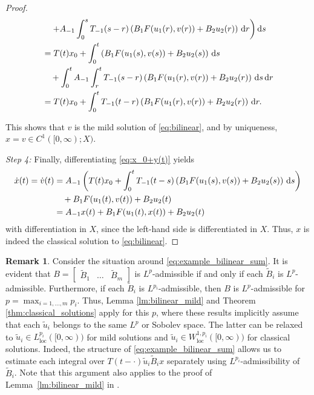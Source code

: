\documentclass{cocv}
\renewcommand{\d}{\,\mathrm{d}}
\newcommand{\ds}{ {\, \rm d} s}
\DeclareMathOperator{\loc}{loc}
\theoremstyle{definition}
\newtheorem{remark}{Remark}
\begin{document}
\begin{proof}
\begin{align}
        &\hspace{1em} \left.+ A_{-1}\int_{0}^s T_{-1}(s-r) \left(B_1F(u_1(r),v(r)) + B_2 u_2(r) \right) \d r\right) \mathrm{d}s\notag\\
        &= T(t)x_0 + \int_{0}^t \left(B_1F(u_1(s),v(s)) + B_2u_2(s)\right) \ds\nonumber \\
        &\hspace{1em}+ \int_{0}^t A_{-1}\int_r^t T_{-1}(s-r) \left(B_1F(u_1(r),v(r)) + B_2u_2(r)\right) \ds \d r \notag\\
        &= T(t)x_0 + \int_{0}^t T_{-1}(t-r)\left(B_1F(u_1(r),v(r)) + B_2u_2(r)\right) \d r.
    \end{align}

    This shows that $v$ is the mild solution of \eqref{eq:bilinear}, and by uniqueness, $x = v \in C^1([0, \infty); X)$.
    
    \emph{Step 4:} Finally, differentiating \eqref{eq:x_0+y(t)} yields
    \begin{align*}
        \dot{x}(t) = \dot{v}(t)
        &= A_{-1}\left(T(t)x_0 + \int_{0}^t T_{-1}(t-s)\left(B_1F(u_1(s),v(s)) + B_2u_2(s)\right) \ds\right) \\
        &\hspace{1em}+ B_1F(u_1(t),v(t)) + B_2u_2(t)\\
        &= A_{-1}x(t) + B_1F(u_1(t),x(t)) + B_2u_2(t)
    \end{align*}
    with differentiation in $X$, since the left-hand side is differentiated in $X$. Thus, $x$ is indeed the classical solution to \eqref{eq:bilinear}.
\end{proof}

\begin{remark}
    Consider the situation around \eqref{eq:example_bilinear_sum}.
    It is evident that $B=\begin{bmatrix} \tilde{B}_1 & \dots & \tilde{B}_m \end{bmatrix}$ is $L^p$-admissible if and only if each $\tilde{B}_i$ is $L^p$-admissible. Furthermore, if each $\tilde{B}_i$ is $L^{p_i}$-admissible, then $B$ is $L^p$-admissible for $p = \max_{i =1,\dots,m}p_i$. Thus, Lemma \ref{lm:bilinear_mild} and Theorem \ref{thm:classical_solutions} apply for this $p$, where these results implicitly assume that each $\tilde{u}_i$ belongs to the same $L^p$ or Sobolev space.
    The latter can be relaxed to $\tilde{u}_i \in L_{\loc}^{p_i}([0,\infty))$ for mild solutions and $\tilde u_i \in W_{\loc}^{1,p_i}([0,\infty))$ for classical solutions. Indeed, the structure of \eqref{eq:example_bilinear_sum} allows us to estimate each integral over $T(t-\cdot) \tilde{u}_i \tilde{B}_ix$ separately using $L^{p_i}$-admissibility of $\tilde{B}_i$. Note that this argument also applies to the proof of Lemma~\ref{lm:bilinear_mild} in \cite{MR4440806}.
\end{remark}
\end{document}
